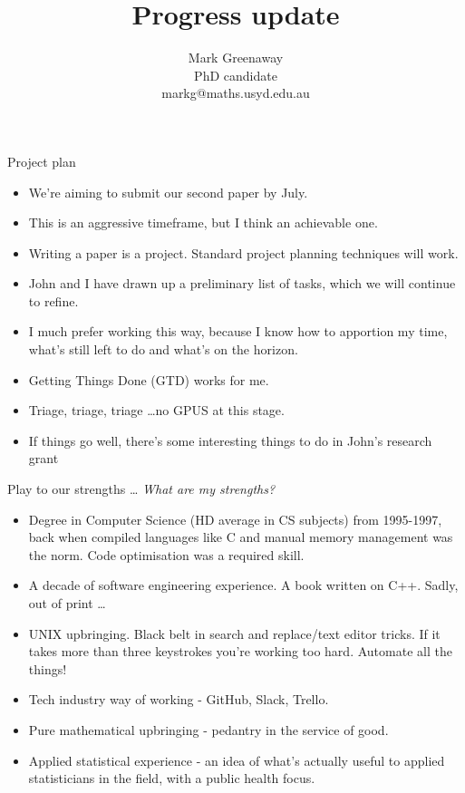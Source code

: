 \documentclass{beamer}
\title{Progress update}
\author{Mark Greenaway\\PhD candidate\\markg@maths.usyd.edu.au}
\begin{document}
\begin{frame}
\titlepage
\end{frame}

\begin{frame}{Project plan}
\begin{itemize}
\item We're aiming to submit our second paper by July. \\
\item This is an aggressive timeframe, but I think an achievable one. \\
\item Writing a paper is a project. Standard project planning techniques will work. \\
\item John and I have drawn up a preliminary list of tasks, which we will continue to refine. \\
\item I much prefer working this way, because I know how to apportion my time, what's still left to do and what's on the horizon. \\ 
\item Getting Things Done (GTD) works for me. \\
\item Triage, triage, triage \ldots no GPUS at this stage. \\
\item If things go well, there's some interesting things to do in John's research grant
\end{itemize}
\end{frame}

\begin{frame}{Play to our strengths \ldots}
\emph{What are my strengths?}
\begin{itemize}
\item Degree in Computer Science (HD average in CS subjects) from 1995-1997, back when compiled languages like C and manual memory management was the norm. Code optimisation was a required skill.
\item A decade of software engineering experience. A book written on C++. Sadly, out of print \ldots
\item UNIX upbringing. Black belt in search and replace/text editor tricks. If it takes more than three keystrokes you're working too hard. Automate all the things!
\item Tech industry way of working - GitHub, Slack, Trello.
\item Pure mathematical upbringing - pedantry in the service of good.
\item Applied statistical experience - an idea of what's actually useful to applied statisticians in the field, with a public health focus.
\end{itemize}
\end{frame}
\end{document}
